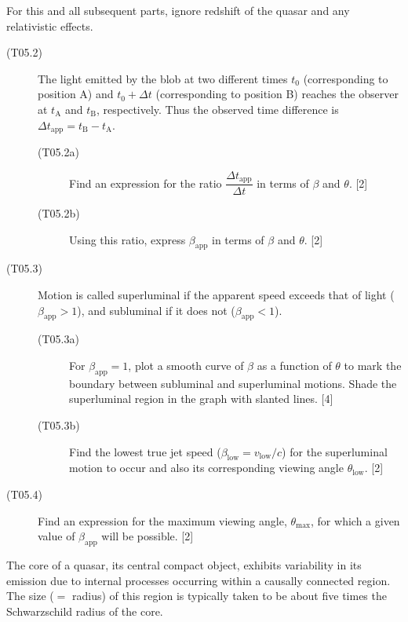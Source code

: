 For this and all subsequent parts, ignore redshift of the quasar and any
relativistic effects.


\begin{description}
\item[(T05.2)] The light emitted by the blob at two different times $t_0$
  (corresponding to position A) and $t_0 + \Delta t$ (corresponding to
  position B) reaches the observer at $t_{\mathrm{A}}$ and $t_{\mathrm{B}}$,
  respectively. Thus the observed time difference is
  $\Delta t_{\mathrm{app}} = t_{\mathrm{B}} - t_{\mathrm{A}}$.
  \begin{description}
  \item[(T05.2a)] Find an expression for the ratio
    $\dfrac{\Delta t_{\mathrm{app}}}{\Delta t}$ in terms of $\beta$ and
    $\theta$. \hfill[2]
  \item[(T05.2b)] Using this ratio, express $\beta_{\mathrm{app}}$ in terms of
    $\beta$ and $\theta$. \hfill[2]
  \end{description}
\item[(T05.3)] Motion is called superluminal if the apparent speed exceeds
  that of light ($\beta_{\mathrm{app}} > 1$), and subluminal if it does not
  ($\beta_{\mathrm{app}} < 1$).
  \begin{description}
  \item[(T05.3a)] For $\beta_{\mathrm{app}} = 1$, plot a smooth curve of
    $\beta$ as a function of $\theta$ to mark the boundary between subluminal
    and superluminal motions. Shade the superluminal region in the graph with
    slanted lines. \hfill[4]
  \item[(T05.3b)] Find the lowest true jet speed
    ($\beta_{\mathrm{low}} = v_{\mathrm{low}}/c$) for the superluminal motion
    to occur and also its corresponding viewing angle $\theta_{\mathrm{low}}$.
    \hfill[2]
  \end{description}
\item[(T05.4)] Find an expression for the maximum viewing angle,
  $\theta_{\max}$, for which a given value of $\beta_{\mathrm{app}}$ will be
  possible. \hfill[2]
\end{description}

The core of a quasar, its central compact object, exhibits variability in its
emission due to internal processes occurring within a causally connected
region. The size ($=$ radius) of this region is typically taken to be about
five times the Schwarzschild radius of the core.

